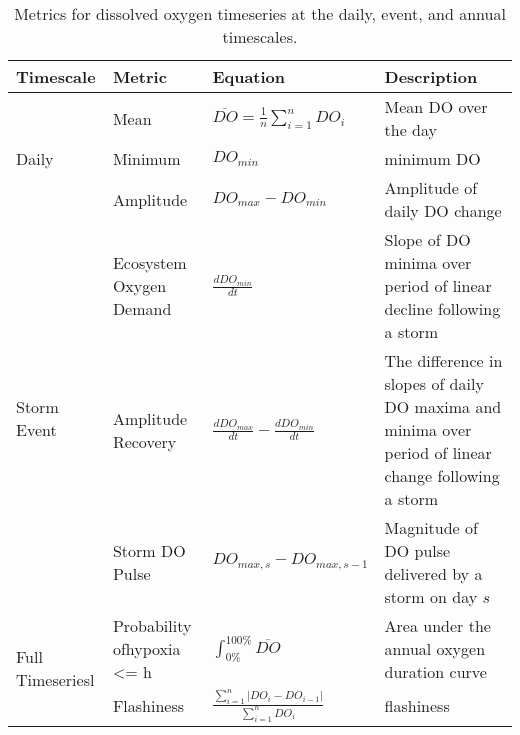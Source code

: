 \documentclass{article}
\begin{document}
\begin{table}[h!]
  \begin{center}
    \caption{Metrics for dissolved oxygen timeseries at the daily, event, and annual timescales.}
    \label{tab:table1}
    \begin{tabular}{p{.8in}|p{1in}|p{1.5in}|p{3in}} 
      \textbf{Timescale} & \textbf{Metric} & \textbf{Equation} & \textbf{Description}\\
      \hline
	\multirow{3}{*}{Daily} & Mean & $\overline{DO}=\frac{1}{n}\sum_{i=1}^{n} DO_{i}$ & Mean DO over the day\\ 
      & Minimum & $DO_{min}$ & minimum DO\\
	& Amplitude & $DO_{max}-DO_{min}$ & Amplitude of daily DO change\\
	\hline
      \multirow {3}{*}{Storm Event} &Ecosystem \newline Oxygen Demand & $\frac{dDO_{min}}{dt}$ & Slope of DO minima over period of linear decline following a storm \\
      & Amplitude Recovery & $\frac{dDO_{max}}{dt} - \frac{dDO_{min}}{dt}$ & The difference in slopes of daily DO maxima and minima over period of linear change following a storm\\
      &Storm DO \newline Pulse & $DO_{max,s} - DO_{max,s-1}$ & Magnitude of DO pulse delivered by a storm on day $s$\\
	
	\hline
	\multirow{2}{*}{Full \newline Timeseriesl} & Probability of\newline hypoxia <= h & $\int_{0\%}^{100\%} \overline{DO}$ & Area under the annual oxygen duration curve\\
	& Flashiness & $\frac{\sum_{i=1}^{n} |DO_{i}-DO_{i-1}|}{\sum_{i=1}^{n} DO_{i}}$ & flashiness\\
    \end{tabular}
  \end{center}
\end{table}
\end{document}
